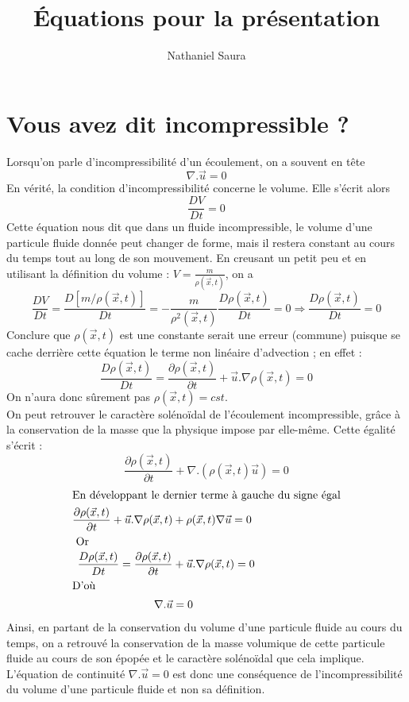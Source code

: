 \documentclass[a4paper,10pt]{article}
\title{Équations pour la présentation}
\author{Nathaniel Saura}
\newcommand{\rhoxt}{\rho(\vec{x},t)}
\begin{document}
\maketitle


\section{Vous avez dit incompressible ?}
Lorsqu'on parle d'incompressibilité d'un écoulement, on a souvent en tête 
\begin{equation}
 \nabla.\vec{u} = 0 \label{incompfalse}
\end{equation}
En vérité, la condition d'incompressibilité concerne le volume. Elle s'écrit alors 
\begin{equation}
 \frac{DV}{Dt} = 0 
\end{equation}
Cette équation nous dit que dans un fluide incompressible, le volume d'une particule fluide donnée peut changer de forme, mais il restera constant au cours du temps tout au long de son mouvement.
En creusant un petit peu et en utilisant la définition du volume : $V = \frac{m}{\rhoxt}$, on a 
\begin{equation}
 \frac{DV}{Dt} = \frac{D[m/\rhoxt]}{Dt} = -\frac{m}{\rho^2(\vec{x},t)} \frac{D\rhoxt}{Dt} = 0 \Rightarrow \frac{D\rhoxt}{Dt} = 0 \label{incomptrue}
\end{equation}
Conclure que $\rhoxt$ est une constante serait une erreur (commune) puisque se cache derrière cette équation le terme non linéaire d'advection ; en effet :
\begin{equation}
 \frac{D\rhoxt}{Dt} = \frac{\partial \rhoxt}{\partial t} + \vec{u}.\nabla\rhoxt =0
\end{equation}
On n'aura donc sûrement pas $\rhoxt = cst$. \\
On peut retrouver le caractère solénoïdal de l'écoulement incompressible, grâce à la conservation de la masse que la physique impose par elle-même. Cette égalité s'écrit :
\begin{equation*}
\frac{\partial \rhoxt}{\partial t} + \nabla.(\rhoxt \vec{u}) = 0
\end{equation*}
\begin{align*}
	\intertext{En développant le dernier terme à gauche du signe égal}
	\frac{\partial \rhoxt}{\partial t} + \vec{u}.\nabla \rhoxt &+ \rhoxt \nabla\vec{u} = 0 \\
	\intertext{ Or }
	\frac{D \rhoxt}{D t} = \frac{\partial \rhoxt}{\partial t} &+ \vec{u}.\nabla \rhoxt = 0 \\
	\intertext{D'où} 
	\nabla . \vec{u} &= 0
\end{align*}
Ainsi, en partant de la conservation du volume d'une particule fluide au cours du temps, on a retrouvé la conservation de la masse volumique de cette particule fluide au cours de son épopée et le caractère solénoïdal que cela implique. L'équation de continuité $\nabla .\vec{u} = 0$ est donc une conséquence de l'incompressibilité du volume d'une particule fluide et non sa définition.

\end{document}
